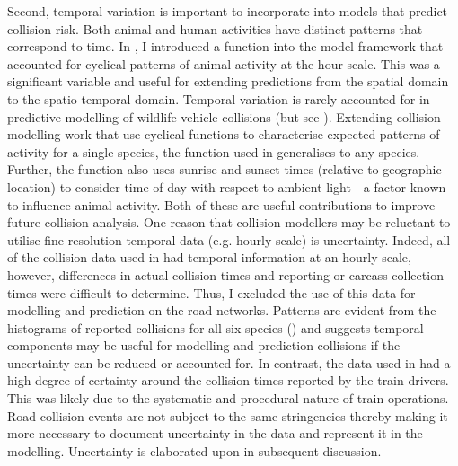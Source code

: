 Second, temporal variation is important to incorporate into models that predict collision risk. Both animal and human activities have distinct patterns that correspond to time. In , I introduced a function into the model framework that accounted for cyclical patterns of animal activity at the hour scale. This was a significant variable and useful for extending predictions from the spatial domain to the spatio-temporal domain. Temporal variation is rarely accounted for in predictive modelling of wildlife-vehicle collisions (but see \cite{}). Extending collision modelling work that use cyclical functions to characterise expected patterns of activity for a single species, the function used in  generalises to any species. Further, the function also uses sunrise and sunset times (relative to geographic location) to consider time of day with respect to ambient light - a factor known to influence animal activity. Both of these are useful contributions to improve future collision analysis. One reason that collision modellers may be reluctant to utilise fine resolution temporal data (e.g. hourly scale) is uncertainty. Indeed, all of the collision data used in  had temporal information at an hourly scale, however, differences in actual collision times and reporting or carcass collection times were difficult to determine. Thus, I excluded the use of this data for modelling and prediction on the road networks. Patterns are evident from the histograms of reported collisions for all six species () and suggests temporal components may be useful for modelling and prediction collisions if the uncertainty can be reduced or accounted for. In contrast, the data used in  had a high degree of certainty around the collision times reported by the train drivers. This was likely due to the systematic and procedural nature of train operations. Road collision events are not subject to the same stringencies thereby making it more necessary to document uncertainty in the data and represent it in the modelling. Uncertainty is elaborated upon in subsequent discussion. 

